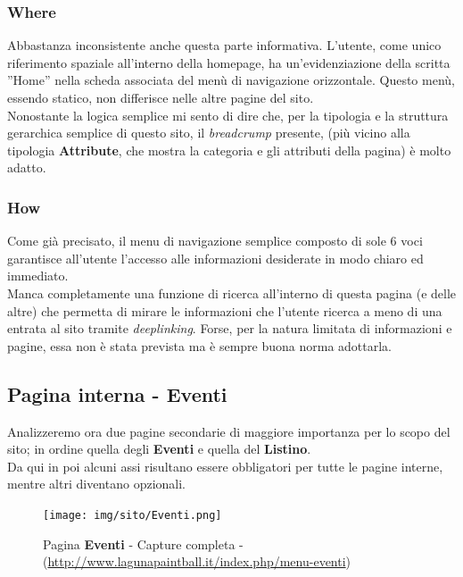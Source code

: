 \documentclass[../Relazione.tex]{subfiles}
\begin{document}
        \subsubsection{Where}
        Abbastanza inconsistente anche questa parte informativa.
        L'utente, come unico riferimento spaziale all'interno della homepage, ha un'evidenziazione della scritta ''Home'' nella scheda associata del menù di navigazione orizzontale.
        Questo menù, essendo statico, non differisce nelle altre pagine del sito.\\
        Nonostante la logica semplice mi sento di dire che, per la tipologia e la struttura gerarchica semplice di questo sito, il \emph{breadcrump} presente, (più vicino alla tipologia \textbf{Attribute}, che mostra la categoria e gli attributi della pagina) è molto adatto.

        \subsubsection{How}
        Come già precisato, il menu di navigazione semplice composto di sole 6 voci garantisce all’utente l’accesso alle informazioni desiderate in modo chiaro ed immediato.\\
        Manca completamente una funzione di ricerca all'interno di questa pagina (e delle altre) che permetta di mirare le informazioni che l'utente ricerca a meno di una entrata al sito tramite \emph{deeplinking}.
        Forse, per la natura limitata di informazioni e pagine, essa non è stata prevista ma è sempre buona norma adottarla.

\newpage

    \subsection{Pagina interna - Eventi}

    Analizzeremo ora due pagine secondarie di maggiore importanza per lo scopo del sito; in ordine quella degli \textbf{Eventi} e quella del \textbf{Listino}.\\

    Da qui in poi alcuni assi risultano essere obbligatori per tutte le pagine interne, mentre altri diventano opzionali.

        \begin{figure}[!h]
            \centering
            \texttt{[image: img/sito/Eventi.png]}
            \caption{Pagina \textbf{Eventi} - Capture completa - (\url{http://www.lagunapaintball.it/index.php/menu-eventi})}
        \end{figure}
\end{document}
